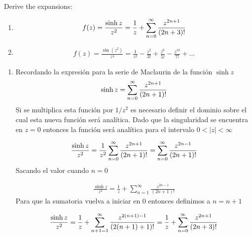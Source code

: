 \begin{problem}{6}
    Derive the expansions:
    \begin{enumerate}
        \item \begin{gather*}
            f(z) =\frac{\sinh z}{z^2} = \frac{1}{z} + \sum_{n = 0}^{\infty} \frac{z^{2n+1}}{(2n+3)!}
        \end{gather*}
        \item \begin{gather*}
            f(z) =\frac{\sin(z^2)}{z^4} = \frac{1}{z^2} - \frac{z^2}{3!} + \frac{z^6}{5!} - \frac{z^{10}}{7!} + \dots
        \end{gather*}
    \end{enumerate}    
\end{problem}

\begin{enumerate}
    \item Recordando la expresión para la serie de Maclaurin de la función $\sinh z$ 
    \begin{gather*}
        \sinh z = \sum_{n = 0}^{\infty} \frac{z^{2n+1}}{(2n+1)!}
    \end{gather*}
    Si se multiplica esta función por $1/z^2$ es necesario definir el dominio sobre el cual esta nueva función será analítica. Dado que la singularidad se encuentra en $z = 0$ entonces la función será analítica para el intervalo $0 < |z| < \infty$

    \begin{gather*}
        \frac{\sinh z}{z^2} =  \frac{1}{z^2}\sum_{n = 0}^{\infty} \frac{z^{2n+1}}{(2n+1)!} = \sum_{n = 0}^{\infty} \frac{z^{2n-1}}{(2n+1)!}
    \end{gather*}
    Sacando el valor cuando $n = 0$

    \begin{gather*}
        \frac{\sinh z}{z^2} =  \frac{1}{z} + \sum_{n = 1}^{\infty} \frac{z^{2n-1}}{(2n+1)!}
    \end{gather*}
    Para que la sumatoria vuelva a iniciar en $0$ entonces definimos a $n = n + 1$ 

    \begin{mdframed}
        \vspace{-0.4 cm}
        \begin{gather}
            \frac{\sinh z}{z^2} =  \frac{1}{z} + \sum_{n + 1= 1}^{\infty} \frac{z^{2(n+1)-1}}{(2(n+1)+1)!} = \frac{1}{z} + \sum_{n = 0}^{\infty} \frac{z^{2n+1}}{(2n+3)!} 
        \end{gather}
    \end{mdframed}


\end{enumerate}
